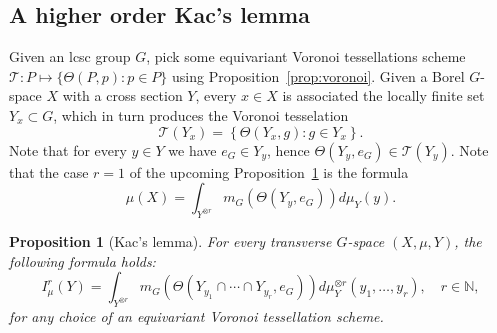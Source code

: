 \documentclass{amsart}
\numberwithin{equation}{subsection}
\newtheorem{prop}[thm]{Proposition}
\theoremstyle{remark}
\begin{document}
\subsection{A higher order Kac's lemma}

Given an lcsc group \(G\), pick some equivariant Voronoi tessellations scheme \(\mathscr{T}:P\mapsto\{\Theta\left(P,p\right): p\in P\}\) using Proposition~\ref{prop:voronoi}. Given a Borel \(G\)-space \(X\) with a cross section \(Y\), every \(x\in X\) is associated the locally finite set \(Y_{x}\subset G\), which in turn produces the Voronoi tesselation
\[\mathscr{T}\left(Y_{x}\right)=\left\{\Theta\left(Y_{x},g\right):g\in Y_{x}\right\}.\]
Note that for every \(y\in Y\) we have \(e_{G}\in Y_{y}\), hence \(\Theta\left(Y_{y},e_{G}\right)\in\mathscr{T}\left(Y_{y}\right)\). Note that the case \(r=1\) of the upcoming Proposition~\ref{prop:Kac} is the formula
\[\mu\left(X\right)=\int_{Y^{\otimes r}}m_{G}\left(\Theta\left(Y_{y},e_{G}\right)\right)d\mu_{Y}\left(y\right).\]

\begin{prop}[Kac's lemma]\label{prop:Kac}
For every transverse \(G\)-space \(\left(X,\mu,Y\right)\), the following formula holds:
\begin{equation}\label{eq:Kac}
I_{\mu}^{r}\left(Y\right)=\int_{Y^{\otimes r}}m_{G}\left(\Theta\left(Y_{y_{1}}\cap\dotsm\cap Y_{y_{r}},e_{G}\right)\right)d\mu_{Y}^{\otimes r}\left(y_{1},\dotsc,y_{r}\right),\quad r\in\mathbb{N},
\end{equation}
for any choice of an equivariant Voronoi tessellation scheme.
\end{prop}
\end{document}
